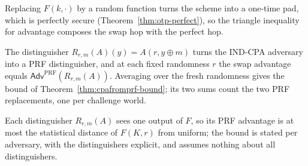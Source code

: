 Replacing $F(k, \cdot)$ by a random function turns the scheme into a one-time pad,
which is perfectly secure (Theorem~\ref{thm:otp-perfect}), so the triangle inequality
for advantage composes the swap hop with the perfect hop.

The distinguisher $R_{r,m}(A)(y) = A(r, y \oplus m)$ turns the IND-CPA adversary into a
PRF distinguisher, and at each fixed randomness $r$ the swap advantage equals
$\mathsf{Adv}^{\mathrm{PRF}}(R_{r,m}(A))$. Averaging over the fresh randomness gives the
bound of Theorem~\ref{thm:cpafromprf-bound}; its two sums count the two PRF
replacements, one per challenge world.

Each distinguisher $R_{r,m}(A)$ sees one output of $F$, so its PRF advantage is at most
the statistical distance of $F(K, r)$ from uniform; the bound is stated per adversary,
with the distinguishers explicit, and assumes nothing about all distinguishers.
